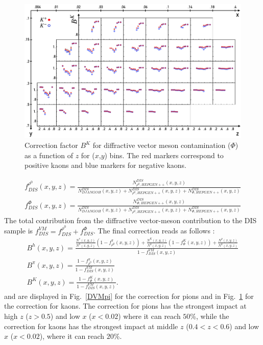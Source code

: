 \begin{figure}
  \centering
	\includegraphics[scale=0.8]{./gfx/DVMK.png}
	\caption{Correction factor $B^{K}$ for diffractive vector meson contamination ($\Phi$) as a function of $z$ for ($x$,$y$) bins. The red markers correspond to positive kaons and blue markers for negative kaons.}
	\label{DVMK}
\end{figure}
%
\begin{equation}\label{eq:DVMDIS}
  \begin{split}
    f^{\rho^0}_{DIS}(x,y,z) = \frac{N^{DIS}_{\rho^0,HEPGEN++}(x,y,z)}{N^{DIS}_{DJANGOH}(x,y,z)+N^{DIS}_{\rho^0,HEPGEN++}(x,y,z)+N^{DIS}_{\Phi,HEPGEN++}(x,y,z)} \\
    f^{\Phi}_{DIS}(x,y,z) = \frac{N^{DIS}_{\Phi,HEPGEN++}(x,y,z)}{N^{DIS}_{DJANGOH}(x,y,z)+N^{DIS}_{\rho^0,HEPGEN++}(x,y,z)+N^{DIS}_{\Phi,HEPGEN++}(x,y,z)}
  \end{split}
\end{equation}
%
The total contribution from the diffractive vector-meson contribution to the DIS sample is $f^{VM}_{DIS} = f^{\rho^0}_{DIS} + f^{\Phi}_{DIS}$. The final correction reads as follows :
%
\begin{equation}
  \begin{split}
  B^h(x,y,z) = \frac{ \frac{N^{\pi}(x,y,z)}{N^h(x,y,z)}\left (1-f^{\pi}_{\rho^0}(x,y,z)\right )
                   + \frac{N^K(x,y,z)}{N^h(x,y,z)}\left (1-f^{K}_{\Phi}(x,y,z)\right ) + \frac{N^p(x,y,z)}{N^h(x,y,z)} }{1-f^{VM}_{DIS}(x,y,z)} \\
  B^{\pi}(x,y,z) = \frac{1-f^{\pi}_{\rho^0}(x,y,z)}{1-f^{VM}_{DIS}(x,y,z)} \\
  B^K(x,y,z) = \frac{1-f^{K}_{\Phi}(x,y,z)}{1-f^{VM}_{DIS}(x,y,z)}.
  \end{split}
\end{equation}
%
and are displayed in Fig.~\ref{DVMpi} for the correction for pions and in Fig.~\ref{DVMK} for the correction for kaons. The correction for pions has the strongest impact at high $z$ ($z>0.5$) and low $x$ ($x<0.02$) where it can reach $50$\%, while the correction for kaons has the strongest impact at middle $z$ ($0.4<z<0.6$) and low $x$ ($x<0.02$), where it can reach $20$\%.

